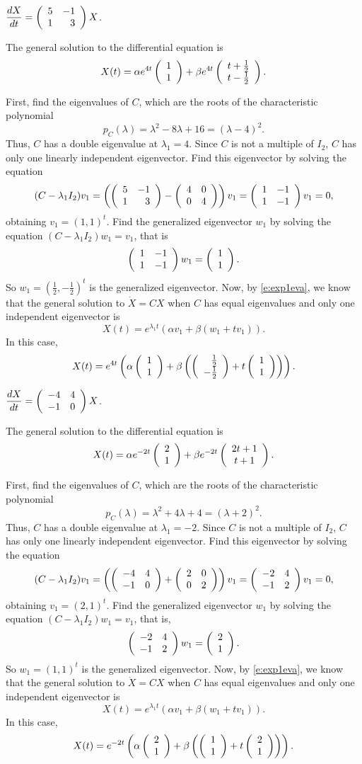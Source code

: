\documentclass{ximera}
\begin{document}
\begin{exercise}  \label{c6.6.2c}
$\displaystyle\frac{dX}{dt} = \left(\begin{array}{rr} 5 & -1\\ 1 &3\end{array}\right) X$.

\begin{solution}
\ans The general solution to the differential equation is
\[
X(t) = \alpha e^{4t}\left(\begin{array}{r} 1 \\ 1\end{array}\right) + \beta e^{4t}\left(\begin{array}{c} t + \frac{1}{2} \\ t - \frac{1}{2}\end{array}\right).
\]

\soln First, find the eigenvalues of $C$, which are the roots of the
characteristic polynomial
\[
p_C(\lambda) = \lambda^2 - 8\lambda + 16 = (\lambda - 4)^2.
\]
Thus, $C$ has a double eigenvalue at $\lambda_1 = 4$.  Since $C$ is not
a multiple of $I_2$, $C$ has only one linearly independent eigenvector.
Find this eigenvector by solving the equation
\[
(C - \lambda_1I_2)v_1 = \left(\left(\begin{array}{rr} 5 & -1\\ 1 &3\end{array}\right) - \left(\begin{array}{rr} 4 & 0\\ 0 &4\end{array}\right)
\right)v_1 = \left(\begin{array}{rr} 1 & -1\\ 1 &-1\end{array}\right)v_1 = 0,
\]
obtaining $v_1 = (1,1)^t$.  Find the generalized eigenvector $w_1$ by
solving the equation $(C - \lambda_1 I_2)w_1 = v_1$, that is
\[
\left(\begin{array}{rr} 1 & -1\\ 1 &-1\end{array}\right)w_1 = \left(\begin{array}{r} 1 \\ 1\end{array}\right).
\]
So $w_1 = (\frac{1}{2},-\frac{1}{2})^t$ is the generalized eigenvector.
Now, by \eqref{e:exp1eva}, we know that the
general solution to $\dot{X} = CX$ when $C$ has equal eigenvalues and only
one independent eigenvector is
\[
X(t) = e^{\lambda_1 t}(\alpha v_1 + \beta(w_1 + tv_1)).
\]
In this case,
\[
X(t) = e^{4t}\left(\alpha \left(\begin{array}{r} 1 \\ 1\end{array}\right) + \beta\left(\left(\begin{array}{r} \frac{1}{2} \\ -\frac{1}{2}\end{array}\right) + t\left(\begin{array}{r} 1 \\ 1\end{array}\right)\right)\right).
\]


\end{solution}
\end{exercise}
\begin{exercise}  \label{c6.6.2d}
$\displaystyle\frac{dX}{dt} = \left(\begin{array}{rr} -4 & 4\\ -1 &0\end{array}\right) X$.

\begin{solution}
\ans The general solution to the differential equation is
\[
X(t) = \alpha e^{-2t}\left(\begin{array}{c} 2 \\ 1\end{array}\right) + \beta e^{-2t}\left(\begin{array}{c} 2t + 1 \\ t + 1\end{array}\right).
\]

\soln First, find the eigenvalues of $C$, which are the roots of the
characteristic polynomial
\[
p_C(\lambda) = \lambda^2 + 4\lambda + 4 = (\lambda + 2)^2.
\]
Thus, $C$ has a double eigenvalue at $\lambda_1 = -2$.  Since $C$ is not
a multiple of $I_2$, $C$ has only one linearly independent eigenvector.
Find this eigenvector by solving the equation
\[
(C - \lambda_1I_2)v_1 = \left(\left(\begin{array}{rr} -4 & 4\\ -1 &0\end{array}\right) + \left(\begin{array}{rr} 2 & 0\\ 0 &2\end{array}\right)
\right)v_1 = \left(\begin{array}{rr} -2 & 4\\ -1 &2\end{array}\right)v_1 = 0,
\]
obtaining $v_1 = (2,1)^t$.  Find the generalized eigenvector $w_1$ by
solving the equation $(C - \lambda_1 I_2)w_1 = v_1$, that is,
\[
\left(\begin{array}{rr} -2 & 4\\ -1 &2\end{array}\right)w_1 = \left(\begin{array}{r} 2 \\ 1\end{array}\right).
\]
So $w_1 = (1,1)^t$ is the generalized eigenvector.
Now, by \eqref{e:exp1eva}, we know that the
general solution to $\dot{X} = CX$ when $C$ has equal eigenvalues and only
one independent eigenvector is
\[
X(t) = e^{\lambda_1 t}(\alpha v_1 + \beta(w_1 + tv_1)).
\]
In this case,
\[
X(t) = e^{-2t}\left(\alpha \left(\begin{array}{r} 2 \\ 1\end{array}\right) + \beta\left(\left(\begin{array}{r} 1 \\ 1\end{array}\right) +
t\left(\begin{array}{r} 2 \\ 1\end{array}\right)\right)\right).
\]






\end{solution}
\end{exercise}
\end{document}

